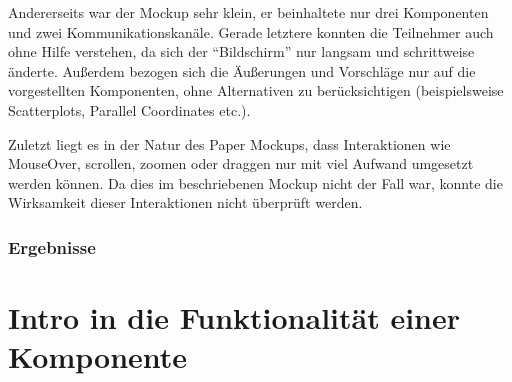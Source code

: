 \documentclass[
	headsepline,
	footsepline,
	fontsize=12pt,
	bibliography=totoc
]{scrbook}
\begin{document}
Andererseits war der Mockup sehr klein, er beinhaltete nur drei Komponenten und zwei Kommunikationskanäle. Gerade letztere konnten die Teilnehmer auch ohne Hilfe verstehen, da sich der \enquote{Bildschirm} nur langsam und schrittweise änderte. Außerdem bezogen sich die Äußerungen und Vorschläge nur auf die vorgestellten Komponenten, ohne Alternativen zu berücksichtigen (beispielsweise Scatterplots, Parallel Coordinates etc.).

Zuletzt liegt es in der Natur des Paper Mockups, dass Interaktionen wie MouseOver, scrollen, zoomen oder draggen nur mit viel Aufwand umgesetzt werden können. Da dies im beschriebenen Mockup nicht der Fall war, konnte die Wirksamkeit dieser Interaktionen nicht überprüft werden.

\subsubsection{Ergebnisse}


\section{Intro in die Funktionalität einer Komponente}
\label{section:konzeption:intro}
\end{document}
